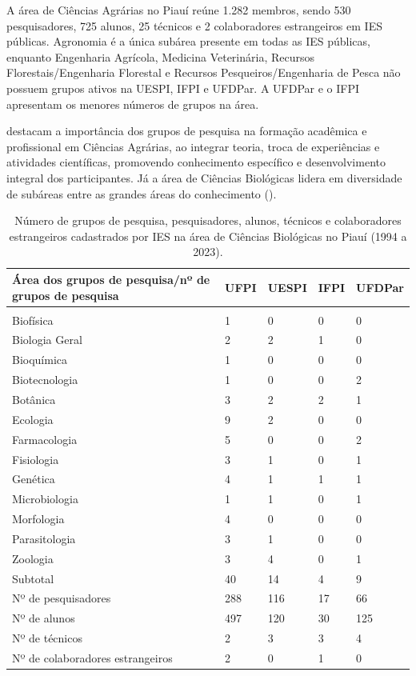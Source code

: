 \documentclass[portuguese]{textolivre}
\begin{document}
A área de Ciências Agrárias no Piauí reúne 1.282 membros, sendo 530 pesquisadores, 725 alunos, 25 técnicos e 2 colaboradores estrangeiros em IES públicas. Agronomia é a única subárea presente em todas as IES públicas, enquanto Engenharia Agrícola, Medicina Veterinária, Recursos Florestais/Engenharia Florestal e Recursos Pesqueiros/Engenharia de Pesca não possuem grupos ativos na UESPI, IFPI e UFDPar. A UFDPar e o IFPI apresentam os menores números de grupos na área.

\textcite{sena2020} destacam a importância dos grupos de pesquisa na formação acadêmica e profissional em Ciências Agrárias, ao integrar teoria, troca de experiências e atividades científicas, promovendo conhecimento específico e desenvolvimento integral dos participantes.
Já a área de Ciências Biológicas lidera em diversidade de subáreas entre as grandes áreas do conhecimento ().

\begin{table}[htbp]
\centering
\begin{threeparttable}
\caption{Número de grupos de pesquisa, pesquisadores, alunos, técnicos e colaboradores estrangeiros cadastrados por IES na área de Ciências Biológicas no Piauí (1994 a 2023).}
\label{tbl5}
\begin{tabular}{>{\raggedright\arraybackslash}p{5cm} l l l l}
\toprule
Área dos grupos de pesquisa/nº de grupos de pesquisa & UFPI & UESPI & IFPI & UFDPar \\ 
\midrule
\multicolumn{5}{c}{Ciências Biológicas} \\
\midrule
Biofísica & 1 & 0 & 0 & 0 \\
Biologia Geral & 2 & 2 & 1 & 0 \\
Bioquímica & 1 & 0 & 0 & 0 \\
Biotecnologia & 1 & 0 & 0 & 2 \\
Botânica & 3 & 2 & 2 & 1 \\
Ecologia & 9 & 2 & 0 & 0 \\
Farmacologia & 5 & 0 & 0 & 2 \\
Fisiologia & 3 & 1 & 0 & 1 \\
Genética & 4 & 1 & 1 & 1 \\
Microbiologia & 1 & 1 & 0 & 1 \\
Morfologia & 4 & 0 & 0 & 0 \\
Parasitologia & 3 & 1 & 0 & 0 \\
Zoologia & 3 & 4 & 0 & 1 \\
\midrule
Subtotal & 40 & 14 & 4 & 9 \\
\midrule
Nº de pesquisadores & 288 & 116 & 17 & 66 \\
Nº de alunos & 497 & 120 & 30 & 125 \\
Nº de técnicos & 2 & 3 & 3 & 4 \\
Nº de colaboradores estrangeiros & 2 & 0 & 1 & 0 \\
\bottomrule
\end{tabular}
\end{threeparttable}
\end{table}
\end{document}
